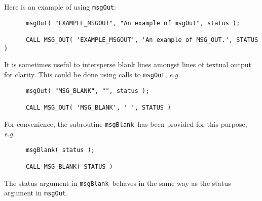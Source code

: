 \documentclass[twoside,11pt]{article}
\renewcommand{\_}{\texttt{\symbol{95}}}
\newcommand{\func}[1]{\texttt{#1}}
\newcommand{\msgblank}{\func{msgBlank}}
\newcommand{\msgout}{\func{msgOut}}
\begin{document}
Here is an example of using \msgout:
\begin {small}
\begin{verbatim}
      msgOut( "EXAMPLE_MSGOUT", "An example of msgOut", status );

      CALL MSG_OUT( 'EXAMPLE_MSGOUT', 'An example of MSG_OUT.', STATUS )
\end{verbatim}
\end {small}
It is sometimes useful to intersperse blank lines amongst lines of textual
output for clarity.
This could be done using calls to \msgout, \textit{e.g.}
\begin {small}
\begin{verbatim}
      msgOut( "MSG_BLANK", "", status );

      CALL MSG_OUT( 'MSG_BLANK', ' ', STATUS )
\end{verbatim}
\end {small}
For convenience, the subroutine \msgblank\ has been provided for this 
purpose, \textit{e.g.}
\begin {small}
\begin{verbatim}
      msgBlank( status );

      CALL MSG_BLANK( STATUS )
\end{verbatim}
\end {small}
The status argument in \msgblank\ behaves in the same way as the status 
argument in \msgout.
\end{document}
